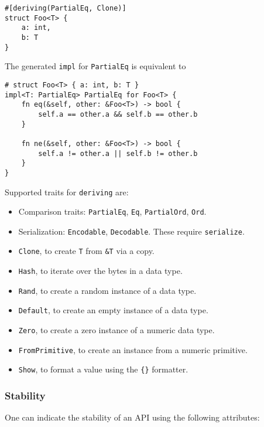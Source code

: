 \documentclass[]{article}
\begin{document}
\begin{verbatim}
#[deriving(PartialEq, Clone)]
struct Foo<T> {
    a: int,
    b: T
}
\end{verbatim}

The generated \texttt{impl} for \texttt{PartialEq} is equivalent to

\begin{verbatim}
# struct Foo<T> { a: int, b: T }
impl<T: PartialEq> PartialEq for Foo<T> {
    fn eq(&self, other: &Foo<T>) -> bool {
        self.a == other.a && self.b == other.b
    }

    fn ne(&self, other: &Foo<T>) -> bool {
        self.a != other.a || self.b != other.b
    }
}
\end{verbatim}

Supported traits for \texttt{deriving} are:

\begin{itemize}
\itemsep1pt\parskip0pt
\item
  Comparison traits: \texttt{PartialEq}, \texttt{Eq},
  \texttt{PartialOrd}, \texttt{Ord}.
\item
  Serialization: \texttt{Encodable}, \texttt{Decodable}. These require
  \texttt{serialize}.
\item
  \texttt{Clone}, to create \texttt{T} from \texttt{\&T} via a copy.
\item
  \texttt{Hash}, to iterate over the bytes in a data type.
\item
  \texttt{Rand}, to create a random instance of a data type.
\item
  \texttt{Default}, to create an empty instance of a data type.
\item
  \texttt{Zero}, to create a zero instance of a numeric data type.
\item
  \texttt{FromPrimitive}, to create an instance from a numeric
  primitive.
\item
  \texttt{Show}, to format a value using the \texttt{\{\}} formatter.
\end{itemize}

\subsubsection{Stability}\label{stability}

One can indicate the stability of an API using the following attributes:
\end{document}
